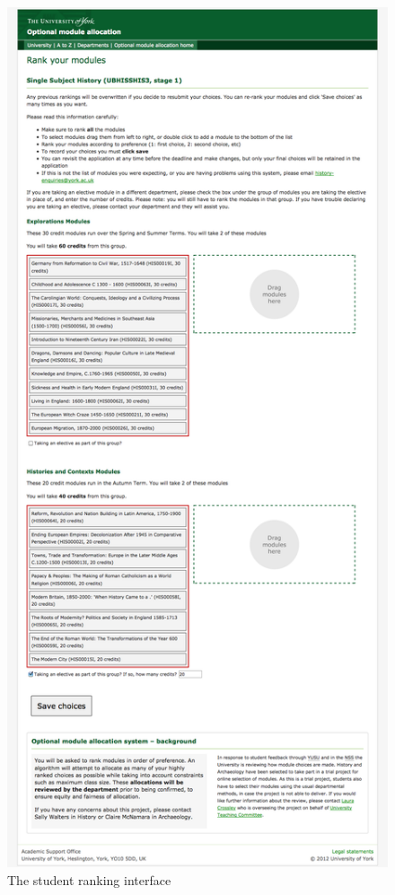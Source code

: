 \begin{landscape}
  \begin{figure}
    \begin{minipage}{0.5\linewidth}
      \centering
      \includegraphics[width=0.6\linewidth]{images/walkthrough/student_rank_modules.png}
      \caption{The student ranking interface}
      \label{walkthrough_student_rank}
    \end{minipage}
    \begin{minipage}{0.5\linewidth}
      \centering

\end{minipage}
\end{figure}
\end{landscape}
